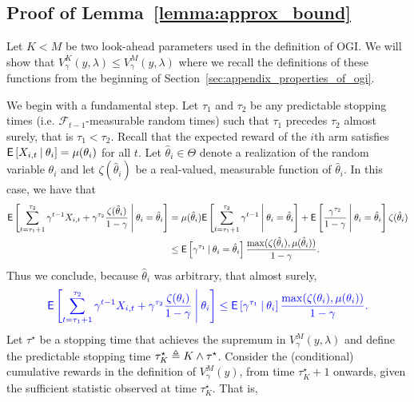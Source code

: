 \subsection{Proof of Lemma~\ref{lemma:approx_bound}} \label{prf:approx_bound}
\begin{myproof}[Proof.]
	Let $K < M$ be two look-ahead parameters used in the definition of OGI. We will show that $V^K_\gamma(y, \lambda) \le V^M_\gamma(y, \lambda)$ where we recall the definitions of these functions from the beginning of Section~\ref{sec:appendix_properties_of_ogi}.
	
	We begin with a fundamental step. Let $\tau_1$ and $\tau_2$ be any predictable stopping times (i.e. $\mathcal F_{t-1}$-measurable random times) such that $\tau_1$ precedes $\tau_2$ almost surely, that is $\tau_1 < \tau_2$. Recall that the expected reward of the $i$th arm satisfies $\Ee{X_{i,t} \given \theta_i} = \mu(\theta_i)$ for all $t$. Let $\hat \theta_i \in \Theta$ denote a realization of the random variable $\theta_i$ and let $\zeta(\hat \theta_i)$ be a real-valued, measurable function of $\hat \theta_i$. In this case, we have that
	\begin{align*}
	\Ee{\sum_{t=\tau_1+1}^{\tau_2} \gamma^{t-1} X_{i,t} + \gamma^{\tau_2}\frac{\zeta(\hat \theta_i)}{1 - \gamma} \given[\Bigg] \theta_i = \hat \theta_i} & =\mu(\hat \theta_i) \Ee{ \sum_{t=\tau_1+1}^{\tau_2} \gamma^{t-1}  \given[\Bigg] \theta_i = \hat \theta_i} + \Ee{\frac{\gamma^{\tau_2}}{1-\gamma}\given[\Bigg] \theta_i = \hat \theta_i}\zeta(\hat \theta_i) \\
	& \le \Ee{\gamma^{\tau_1} \given \theta_i = \hat \theta_i}  \frac{\max(\zeta(\hat \theta_i), \mu(\hat \theta_i))}{1-\gamma}.
	\end{align*}
	Thus we conclude, because $\hat \theta_i$ was arbitrary, that almost surely,
	\begin{equation} \label{ineq:fundamntal_bound_for_lemma_2}
	\color{blue}
	\Ee{\sum_{t=\tau_1+1}^{\tau_2} \gamma^{t-1} X_{i,t} + \gamma^{\tau_2}\frac{\zeta( \theta_i)}{1 - \gamma} \given[\Bigg] \theta_i}  \le \Ee{\gamma^{\tau_1} \given \theta_i }  \frac{\max(\zeta( \theta_i), \mu(\theta_i))}{1-\gamma}.
	\end{equation}
	Let $\tau^\star$ be a stopping time that achieves the supremum in  $V_\gamma^M(y, \lambda)$ and define the predictable stopping time $\tau^\star_K \defeq K \wedge \tau^\star$. Consider the (conditional) cumulative rewards in the definition of $V^M_\gamma(y)$, from time $\tau^\star_K+1$ onwards, given the sufficient statistic observed at time $\tau_K^\star$. That is, 

\end{myproof}
